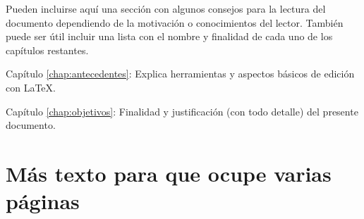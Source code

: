 Pueden incluirse aquí una sección con algunos consejos para la lectura del
documento dependiendo de la motivación o conocimientos del lector.  También
puede ser útil incluir una lista con el nombre y finalidad de cada uno de los
capítulos restantes.


\begin{definitionlist}
\item[Capítulo \ref{chap:antecedentes}: \nameref{chap:antecedentes}] Explica herramientas
  y aspectos básicos de edición con \LaTeX.
\item[Capítulo \ref{chap:objetivos}: \nameref{chap:objetivos}] Finalidad y justificación
  (con todo detalle) del presente documento.
\end{definitionlist}


\section{Más texto para que ocupe varias páginas}


